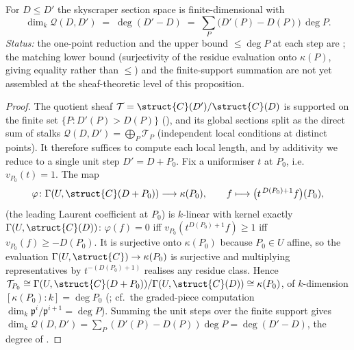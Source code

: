 \begin{proposition}
  \label{thm:adelic_dim_adele_quotient_eq_degree}
  For \(D \le D'\) the skyscraper section space is finite-dimensional
  with
  \[
    \dim_k \mathcal{Q}(D, D')
      \;=\; \deg(D' - D)
      \;=\; \sum_P \bigl(D'(P) - D(P)\bigr)\,\deg P .
  \]
  \emph{Status:} the one-point reduction and the upper bound \(\le \deg
  P\) at each step are ;
  the matching lower bound (surjectivity of the residue evaluation onto
  \(\kappa(P)\), giving equality rather than \(\le\)) and the
  finite-support summation are not yet assembled at the sheaf-theoretic
  level of this proposition.
\end{proposition}
\begin{proof}
  The quotient sheaf \(\mathcal{T} = \struct{C}(D')/\struct{C}(D)\) is
  supported on the finite set \(\{P : D'(P) > D(P)\}\)
  (), and its global sections split
  as the direct sum of stalks
  \(\mathcal{Q}(D, D') = \bigoplus_P \mathcal{T}_P\) (independent local
  conditions at distinct points). It therefore suffices to compute each
  local length, and by additivity we reduce to a single unit step
  \(D' = D + P_0\). Fix a uniformiser \(t\) at \(P_0\), i.e.\
  \(v_{P_0}(t) = 1\). The map
  \[
    \varphi \colon \Gamma(U, \struct{C}(D + P_0)) \longrightarrow \kappa(P_0),
    \qquad
    f \longmapsto \bigl(t^{\,D(P_0) + 1} f\bigr)(P_0),
  \]
  (the leading Laurent coefficient at \(P_0\)) is \(k\)-linear with kernel
  exactly \(\Gamma(U, \struct{C}(D))\): \(\varphi(f) = 0\) iff
  \(v_{P_0}(t^{D(P_0)+1} f) \ge 1\) iff \(v_{P_0}(f) \ge -D(P_0)\). It is
  surjective onto \(\kappa(P_0)\) because \(P_0 \in U\) affine, so the
  evaluation \(\Gamma(U, \struct{C}) \to \kappa(P_0)\) is surjective and
  multiplying representatives by \(t^{-(D(P_0)+1)}\) realises any residue
  class. Hence
  \(\mathcal{T}_{P_0} \cong \Gamma(U, \struct{C}(D + P_0))/
  \Gamma(U, \struct{C}(D)) \cong \kappa(P_0)\), of \(k\)-dimension
  \([\kappa(P_0) : k] = \deg P_0\)
  (; cf.\ the graded-piece computation
  \(\dim_k \mathfrak p^{i}/\mathfrak p^{i+1} = \deg P\)). Summing the unit
  steps over the finite support gives
  \(\dim_k \mathcal{Q}(D, D') = \sum_P (D'(P) - D(P))\deg P = \deg(D' - D)\),
  the degree of \Cref{def:divisor_degree}.
\end{proof}


